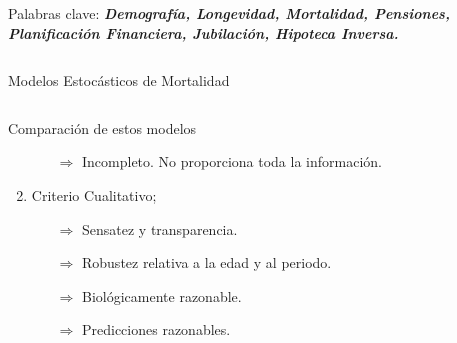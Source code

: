 \documentclass[]{beamer}
\begin{document}
\begin{frame}{\vspace{1ex}\hfill Palabras clave: \bfseries \textit{Demograf\'ia, Longevidad, Mortalidad, Pensiones, Planificaci\'on Financiera, Jubilaci\'on, Hipoteca Inversa.}}
\begin{columns}[t]
\begin{block}{Modelos Estoc\'asticos de Mortalidad}
\begin{columns}[t]
\begin{block}{Comparaci\'on de estos modelos}
\begin{enumerate}
\begin{enumerate}
							\item[$\Rightarrow$] Incompleto. No proporciona toda la informaci\'on.
						\end{enumerate}
						\item Criterio Cualitativo;
						\begin{enumerate}
							\item[$\Rightarrow$] Sensatez y transparencia.
							\item[$\Rightarrow$] Robustez relativa a la edad y al periodo.
							\item[$\Rightarrow$] Biol\'ogicamente razonable.
							\item[$\Rightarrow$] Predicciones razonables.					
						\end{enumerate}
					\end{enumerate}


				\end{block}
			\end{columns}
			

\end{block}
\end{columns}
\end{frame}
\end{document}
